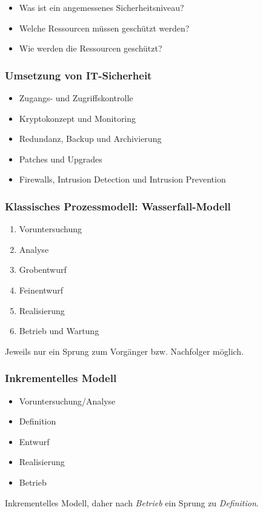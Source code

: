 \begin{itemize}
	\item Was ist ein angemessenes Sicherheitsniveau?
	\item Welche Ressourcen müssen geschützt werden?
	\item Wie werden die Ressourcen geschützt?
\end{itemize}

\subsubsection{Umsetzung von IT-Sicherheit}
\begin{itemize}
	\item Zugangs- und Zugriffskontrolle
	\item Kryptokonzept und Monitoring
	\item Redundanz, Backup und Archivierung
	\item Patches und Upgrades
	\item Firewalls, Intrusion Detection und Intrusion Prevention
\end{itemize}

\subsubsection{Klassisches Prozessmodell: Wasserfall-Modell}
\begin{enumerate}
	\item Voruntersuchung
	\item Analyse
	\item Grobentwurf
	\item Feinentwurf
	\item Realisierung
	\item Betrieb und Wartung
\end{enumerate}
Jeweils nur ein Sprung zum Vorgänger bzw. Nachfolger möglich.

\subsubsection{Inkrementelles Modell}
\begin{itemize}
	\item Voruntersuchung/Analyse
	\item Definition
	\item Entwurf
	\item Realisierung
	\item Betrieb
\end{itemize}
Inkrementelles Modell, daher nach \textit{Betrieb} ein Sprung zu \textit{Definition}.

